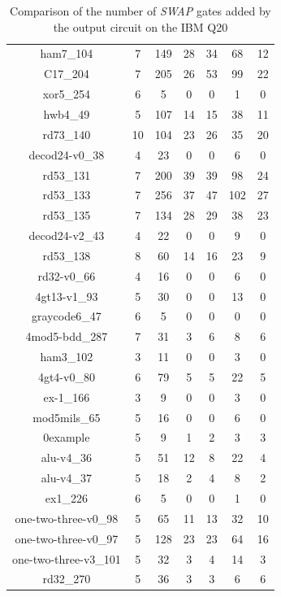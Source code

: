 \documentclass[runningheads]{llncs}
\begin{document}
\begin{table}[H]
\begin{center}
\begin{tabular}{|c|c|c|c|c|c|c|}
ham7\_104 & 7 & 149 & 28 & 34 & 68 & 12 \\ 
C17\_204 & 7 & 205 & 26 & 53 & 99 & 22 \\ 
xor5\_254 & 6 & 5 & 0 & 0 & 1 & 0 \\ 
hwb4\_49 & 5 & 107 & 14 & 15 & 38 & 11 \\ 
rd73\_140 & 10 & 104 & 23 & 26 & 35 & 20 \\ 
decod24-v0\_38 & 4 & 23 & 0 & 0 & 6 & 0 \\ 
rd53\_131 & 7 & 200 & 39 & 39 & 98 & 24 \\ 
rd53\_133 & 7 & 256 & 37 & 47 & 102 & 27 \\ 
rd53\_135 & 7 & 134 & 28 & 29 & 38 & 23 \\ 
decod24-v2\_43 & 4 & 22 & 0 & 0 & 9 & 0 \\ 
rd53\_138 & 8 & 60 & 14 & 16 & 23 & 9 \\ 
rd32-v0\_66 & 4 & 16 & 0 & 0 & 6 & 0 \\ 
4gt13-v1\_93 & 5 & 30 & 0 & 0 & 13 & 0 \\ 
graycode6\_47 & 6 & 5 & 0 & 0 & 0 & 0 \\ 
4mod5-bdd\_287 & 7 & 31 & 3 & 6 & 8 & 6 \\ 
ham3\_102 & 3 & 11 & 0 & 0 & 3 & 0 \\ 
4gt4-v0\_80 & 6 & 79 & 5 & 5 & 22 & 5 \\ 
ex-1\_166 & 3 & 9 & 0 & 0 & 3 & 0 \\ 
mod5mils\_65 & 5 & 16 & 0 & 0 & 6 & 0 \\ 
0example & 5 & 9 & 1 & 2 & 3 & 3 \\ 
alu-v4\_36 & 5 & 51 & 12 & 8 & 22 & 4 \\ 
alu-v4\_37 & 5 & 18 & 2 & 4 & 8 & 2 \\ 
ex1\_226 & 6 & 5 & 0 & 0 & 1 & 0 \\ 
one-two-three-v0\_98 & 5 & 65 & 11 & 13 & 32 & 10 \\ 
one-two-three-v0\_97 & 5 & 128 & 23 & 23 & 64 & 16 \\ 
one-two-three-v3\_101 & 5 & 32 & 3 & 4 & 14 & 3 \\ 
rd32\_270 & 5 & 36 & 3 & 3 & 6 & 6 \\
\hline
	\end{tabular} 
	\end{center}
	\caption{Comparison of  the number of \textit{SWAP} gates added by the 
	output circuit on the IBM Q20 } 
	\label{tab2}
	\end{table}
\end{document}
